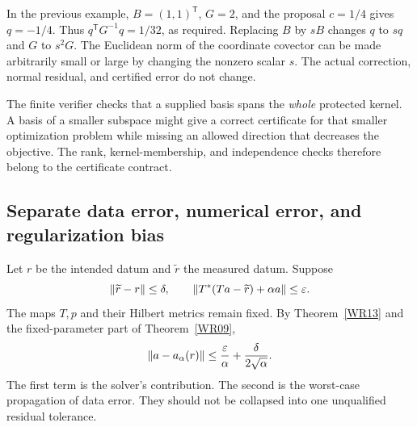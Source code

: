 In the previous example, $B=(1,1)^{\mathsf T}$, $G=2$, and the proposal $c=1/4$ gives $q=-1/4$. Thus $q^{\mathsf T}G^{-1}q=1/32$, as required. Replacing $B$ by $sB$ changes $q$ to $sq$ and $G$ to $s^2G$. The Euclidean norm of the coordinate covector can be made arbitrarily small or large by changing the nonzero scalar $s$. The actual correction, normal residual, and certified error do not change.


The finite verifier checks that a supplied basis spans the \emph{whole} protected kernel. A basis of a smaller subspace might give a correct certificate for that smaller optimization problem while missing an allowed direction that decreases the objective. The rank, kernel-membership, and independence checks therefore belong to the certificate contract.

\subsection{Separate data error, numerical error, and regularization bias}
Let $r$ be the intended datum and $\widetilde r$ the measured datum. Suppose
\[
 \left\lVert\widetilde r-r\right\rVert\le\delta,
 \qquad \left\lVert T^*(Ta-\widetilde r)+\alpha a\right\rVert\le\varepsilon.
\]
The maps $T,p$ and their Hilbert metrics remain fixed. By Theorem~\ref{WR13} and the fixed-parameter part of Theorem~\ref{WR09},
\begin{equation}\label{eq:combined-solver-data}
 \left\lVert a-a_\alpha(r)\right\rVert
 \le \frac{\varepsilon}{\alpha}+\frac{\delta}{2\sqrt\alpha}.
\end{equation}
The first term is the solver's contribution. The second is the worst-case propagation of data error. They should not be collapsed into one unqualified residual tolerance.

